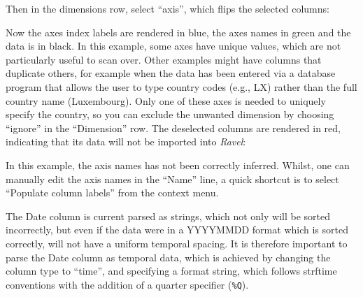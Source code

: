 Then in the dimensions row, select ``axis'', which flips the selected
columns:
\begin{center}
\par\end{center}

Now the axes index labels are rendered in blue, the axes names in
green and the data is in black. In this example, some axes have unique
values, which are not particularly useful to scan over. Other examples
might have columns that duplicate others, for example when the data
has been entered via a database program that allows the user to type
country codes (e.g., LX) rather than the full country name (Luxembourg).
Only one of these axes is needed to uniquely specify the country,
so you can exclude the unwanted dimension by choosing ``ignore''
in the ``Dimension'' row. The deselected columns are rendered in
red, indicating that its data will not be imported into \emph{Ravel}:
\begin{center}
\par\end{center}

In this example, the axis names has not been correctly inferred. Whilst,
one can manually edit the axis names in the ``Name'' line, a quick
shortcut is to select ``Populate column labels'' from the context menu. 
\begin{center}
\par\end{center}

The Date column is current parsed as strings, which not only will
be sorted incorrectly, but even if the data were in a YYYYMMDD format
which is sorted correctly, will not have a uniform temporal spacing.
It is therefore important to parse the Date column as temporal data,
which is achieved by changing the column type to ``time'', and specifying
a format string, which follows strftime conventions with the addition
of a quarter specifier (\verb+%Q+). \label{strftime format specifier}

